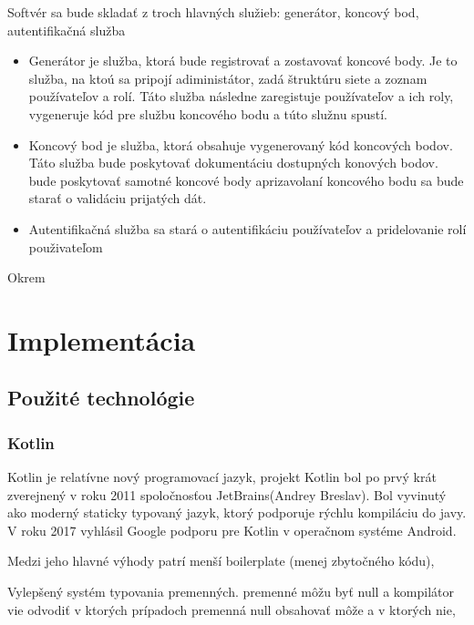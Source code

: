 Softvér sa bude skladať z troch hlavných služieb: generátor, koncový bod, autentifikačná služba
\begin{itemize}
	\item Generátor je služba, ktorá bude registrovať a zostavovať koncové body. Je to služba, na ktoú sa pripojí adiministátor, zadá štruktúru siete a zoznam používateľov a rolí. Táto služba následne zaregistuje používateľov a ich roly, vygeneruje kód pre službu koncového bodu a túto služnu spustí.
	\item Koncový bod je služba, ktorá obsahuje vygenerovaný kód koncových bodov. Táto služba bude poskytovať dokumentáciu dostupných konových bodov. bude poskytovať samotné koncové body aprizavolaní koncového bodu sa bude starať o validáciu prijatých dát.
	\item Autentifikačná služba sa stará o autentifikáciu používateľov a pridelovanie rolí použivateľom
\end{itemize}

Okrem 



\section{Implementácia} 


  

\subsection{Použité technológie} 

  

\subsubsection{Kotlin} 

Kotlin je relatívne nový programovací jazyk, projekt Kotlin bol po prvý krát zverejnený v roku 2011 spoločnosťou JetBrains(Andrey Breslav). Bol vyvinutý ako moderný staticky typovaný jazyk, ktorý podporuje rýchlu kompiláciu do javy. V roku 2017 vyhlásil Google podporu pre Kotlin v operačnom systéme Android.  

Medzi jeho hlavné výhody patrí menší boilerplate (menej zbytočného kódu),  

Vylepšený systém typovania premenných. premenné môžu byť null a kompilátor vie odvodiť v ktorých prípadoch premenná null obsahovať môže a v ktorých nie,  

